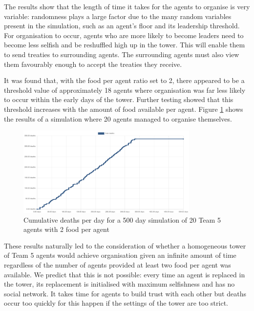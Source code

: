 The results show that the length of time it takes for the agents to organise is very variable: randomness plays a large factor due to the many random variables present in the simulation, such as an agent's floor and its leadership threshold. For organisation to occur, agents who are more likely to become leaders need to become less selfish and be reshuffled high up in the tower. This will enable them to send treaties to surrounding agents. The surrounding agents must also view them favourably enough to accept the treaties they receive.

It was found that, with the food per agent ratio set to 2, there appeared to be a threshold value of approximately 18 agents where organisation was far less likely to occur within the early days of the tower. Further testing showed that this threshold increases with the amount of food available per agent. Figure \ref{fig:team5-20agents-2food} shows the results of a simulation where 20 agents managed to organise themselves.

\begin{figure}
    \centering
    \includegraphics[width=0.8\textwidth]{007_team_5_agent_design/20-agent-2-food.png}
    \caption{Cumulative deaths per day for a 500 day simulation of 20 Team 5 agents with 2 food per agent}
    \label{fig:team5-20agents-2food}
\end{figure}

These results naturally led to the consideration of whether a homogeneous tower of Team 5 agents would achieve organisation given an infinite amount of time regardless of the number of agents provided at least two food per agent was available. We predict that this is not possible: every time an agent is replaced in the tower, its replacement is initialised with maximum selfishness and has no social network. It takes time for agents to build trust with each other but deaths occur too quickly for this happen if the settings of the tower are too strict.

